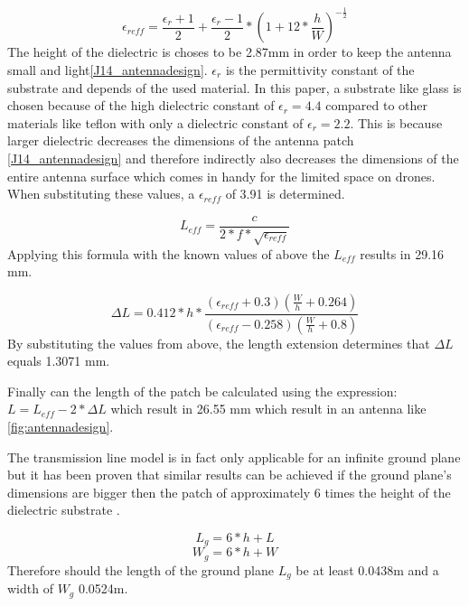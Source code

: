 $$\epsilon_{reff} = \frac{\epsilon_r+1}{2}+  \frac{\epsilon_r-1}{2} * \left(1+12*\frac{h}{W}\right)^{-\frac{1}{2}}$$
The height of the dielectric is choses to be 2.87mm in order to keep the antenna small and light\ref{J14_antennadesign}.
$\epsilon_r$ is the permittivity constant of the substrate and depends of the used material. In this paper, a substrate like glass 
is chosen because of the high dielectric constant of $\epsilon_r = 4.4$ compared to other materials like teflon with only a dielectric 
constant of $\epsilon_r = 2.2$. This is because larger dielectric decreases the dimensions of the antenna patch \ref{J14_antennadesign} 
and therefore indirectly also decreases the dimensions of the entire antenna surface which comes in handy for the limited space on 
drones. When substituting these values, a $\epsilon_{reff}$ of 3.91 is determined.

\begin{equation} 
L_{eff} = \frac{c}{2*f*\sqrt{\epsilon_{reff}}}
\end{equation}
Applying this formula with the known values of above the $L_{eff}$ results in 29.16 mm.

\begin{equation} 
\Delta L = 0.412*h*\frac{(\epsilon_{reff}+0.3)\left(\frac{W}{h}+0.264\right)}{\left(\epsilon_{reff}-0.258\right)\left(\frac{W}{h}+0.8\right)}
\end{equation}
By substituting the values from above, the length extension determines that $\Delta L$ equals 1.3071 mm.

Finally can the length of the patch be calculated using the expression: $L = L_{eff} - 2 * \Delta L$
which result in 26.55 mm which result in an antenna like \ref{fig:antennadesign}.

The transmission line model is in fact only applicable for an infinite ground plane but it has been proven that similar results
can be achieved if the ground plane's dimensions are bigger then the patch of approximately 6 times the height of the dielectric substrate \cite{J14_antennadesign,J15_antennadesign}.

\begin{equation} 
L_{g} = 6 * h + L
\end{equation}
\begin{equation} 
W_{g} = 6 * h + W
\end{equation}
Therefore should the length of the ground plane $L_{g}$ be at least 0.0438m and a width of $W_{g}$ 0.0524m.

